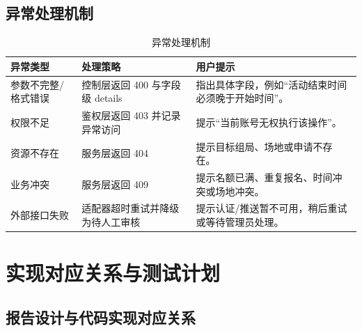 \documentclass[a4paper]{article}
\begin{document}
\subsection{异常处理机制}

\begin{table}[H]
  \centering
  \begin{tabularx}{\linewidth}{P{3.0cm} P{5.9cm} Y}
    \toprule
    异常类型 & 处理策略 & 用户提示 \\
    \midrule
    参数不完整/格式错误 & 控制层返回 400 与字段级 details & 指出具体字段，例如“活动结束时间必须晚于开始时间”。 \\
    权限不足 & 鉴权层返回 403 并记录异常访问 & 提示“当前账号无权执行该操作”。 \\
    资源不存在 & 服务层返回 404 & 提示目标组局、场地或申请不存在。 \\
    业务冲突 & 服务层返回 409 & 提示名额已满、重复报名、时间冲突或场地冲突。 \\
    外部接口失败 & 适配器超时重试并降级为待人工审核 & 提示认证/推送暂不可用，稍后重试或等待管理员处理。 \\
    \bottomrule
  \end{tabularx}
  \caption{异常处理机制}
\end{table}

\section{实现对应关系与测试计划}

\subsection{报告设计与代码实现对应关系}
\end{document}
